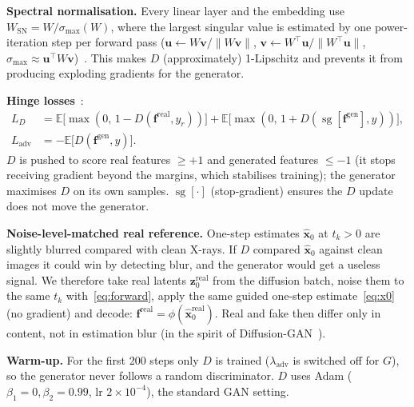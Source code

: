 \documentclass[twoside,english]{article}
\newcommand{\E}{\mathbb{E}}
\newcommand{\z}{\mathbf{z}}
\newcommand{\f}{\mathbf{f}}
\newcommand{\hx}{\hat{\mathbf{x}}_0}
\newcommand{\sg}{\operatorname{sg}}
\begin{document}
\textbf{Spectral normalisation.} Every linear layer and the embedding use $W_{\text{SN}}=W/\sigma_{\max}(W)$, where the largest singular value is estimated by one power-iteration step per forward pass ($\mathbf u\leftarrow W\mathbf v/\|W\mathbf v\|$, $\mathbf v\leftarrow W^\top\mathbf u/\|W^\top\mathbf u\|$, $\sigma_{\max}\approx\mathbf u^\top W\mathbf v$)~\citep{miyato2018sn}. This makes $D$ (approximately) 1-Lipschitz and prevents it from producing exploding gradients for the generator.

\textbf{Hinge losses}~\citep{lim2017geometric}:
\begin{align}
L_D&=\E\big[\max(0,\,1-D(\f^{\text{real}},y_r))\big]+\E\big[\max(0,\,1+D(\sg[\f^{\text{gen}}],y))\big],\label{eq:LD}\\
L_{\text{adv}}&=-\E\big[D(\f^{\text{gen}},y)\big].\label{eq:Ladv}
\end{align}
$D$ is pushed to score real features $\ge+1$ and generated features $\le-1$ (it stops receiving gradient beyond the margins, which stabilises training); the generator maximises $D$ on its own samples. $\sg[\cdot]$ (stop-gradient) ensures the $D$ update does not move the generator.

\textbf{Noise-level-matched real reference.} One-step estimates $\hx$ at $t_k>0$ are slightly blurred compared with clean X-rays. If $D$ compared $\hx$ against clean images it could win by detecting blur, and the generator would get a useless signal. We therefore take real latents $\z_0^{\text{real}}$ from the diffusion batch, noise them to the same $t_k$ with~\eqref{eq:forward}, apply the same guided one-step estimate~\eqref{eq:x0} (no gradient) and decode: $\f^{\text{real}}=\phi(\hx^{\text{real}})$. Real and fake then differ only in content, not in estimation blur (in the spirit of Diffusion-GAN~\citep{wang2023diffusiongan}).

\textbf{Warm-up.} For the first 200 steps only $D$ is trained ($\lambda_{\text{adv}}$ is switched off for $G$), so the generator never follows a random discriminator. $D$ uses Adam ($\beta_1=0,\beta_2=0.99$, lr $2\times10^{-4}$), the standard GAN setting.
\end{document}
